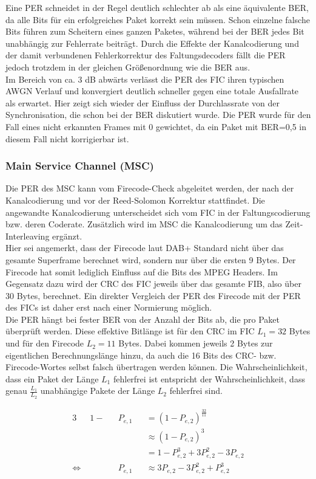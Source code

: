 Eine PER schneidet in der Regel deutlich schlechter ab als eine äquivalente BER, da alle Bits für ein erfolgreiches Paket korrekt sein müssen. Schon einzelne falsche Bits führen zum Scheitern eines ganzen Paketes, während bei der BER jedes Bit unabhängig zur Fehlerrate beiträgt. Durch die Effekte der Kanalcodierung und der damit verbundenen Fehlerkorrektur des Faltungsdecoders fällt die PER jedoch trotzdem in der gleichen Größenordnung wie die BER aus. \\
Im Bereich von ca. 3 dB abwärts verlässt die PER des FIC ihren typischen AWGN Verlauf und konvergiert deutlich schneller gegen eine totale Ausfallrate als erwartet. Hier zeigt sich wieder der Einfluss der Durchlassrate von der Synchronisation, die schon bei der BER diskutiert wurde. Die PER wurde für den Fall eines nicht erkannten Frames mit 0 gewichtet, da ein Paket mit BER=0,5 in diesem Fall nicht korrigierbar ist.\\
\subsubsection{Main Service Channel (MSC)}
Die PER des MSC kann vom Firecode-Check abgeleitet werden, der nach der Kanalcodierung und vor der Reed-Solomon Korrektur stattfindet. Die angewandte Kanalcodierung unterscheidet sich vom FIC in der Faltungscodierung bzw. deren Coderate. Zusätzlich wird im MSC die Kanalcodierung um das Zeit-Interleaving ergänzt.\\
Hier sei angemerkt, dass der Firecode laut DAB+ Standard nicht über das gesamte Superframe berechnet wird, sondern nur über die ersten 9 Bytes. Der Firecode hat somit lediglich Einfluss auf die Bits des MPEG Headers. Im Gegensatz dazu wird der CRC des FIC jeweils über das gesamte FIB, also über 30 Bytes, berechnet. Ein direkter Vergleich der PER des Firecode mit der PER des FICs ist daher erst nach einer Normierung möglich.\\
Die PER hängt bei fester BER von der Anzahl der Bits ab, die pro Paket überprüft werden. Diese effektive Bitlänge ist für den CRC im FIC $L_1 = 32$ Bytes und für den Firecode $L_2 = 11$ Bytes. Dabei kommen jeweils 2 Bytes zur eigentlichen Berechnungslänge hinzu, da auch die 16 Bits des CRC- bzw. Firecode-Wortes selbst falsch übertragen werden können. Die Wahrscheinlichkeit, dass ein Paket der Länge $L_1$ fehlerfrei ist entspricht der Wahrscheinlichkeit, dass genau $\frac{L_1}{L_2}$ unabhängige Pakete der Länge $L_2$ fehlerfrei sind.

\begin{alignat}{3}
&1-&&P_{e,1} &&= (1-P_{e,2})^\frac{32}{11}\nonumber \\
& && &&\approx (1-P_{e,2})^3\nonumber \\
& && &&= 1-P_{e,2}^3+3P_{e,2}^2-3P_{e,2}\nonumber \\
\Leftrightarrow\; & &&P_{e,1} &&\approx 3P_{e,2}-3P_{e,2}^2+P_{e,2}^3 \label{eq:per}
\end{alignat}

